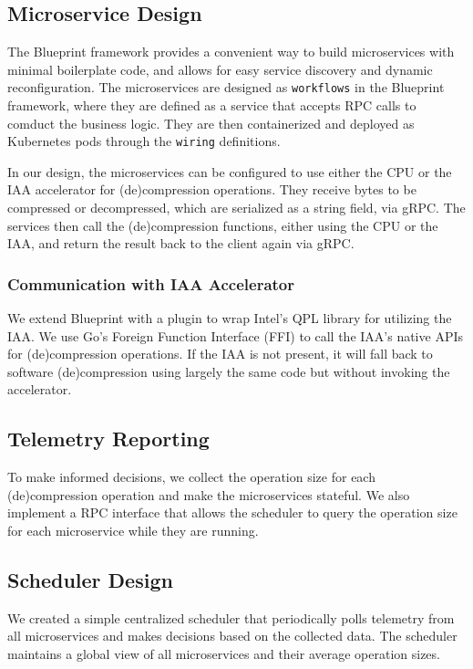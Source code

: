 \subsection{Microservice Design}

The Blueprint framework provides a convenient way to build microservices with minimal boilerplate code, and allows for easy service discovery and dynamic reconfiguration.
The microservices are designed as \texttt{workflows} in the Blueprint framework, where they are defined as a service that accepts RPC calls to comduct the business logic.
They are then containerized and deployed as Kubernetes pods through the \texttt{wiring} definitions.

In our design, the microservices can be configured to use either the CPU or the IAA accelerator for (de)compression operations.
They receive bytes to be compressed or decompressed, which are serialized as a string field, via gRPC.
The services then call the (de)compression functions, either using the CPU or the IAA, and return the result back to the client again via gRPC.

\subsubsection{Communication with IAA Accelerator}

We extend Blueprint with a plugin to wrap Intel's QPL library \cite{intelIntelQpl2025} for utilizing the IAA.
We use Go's Foreign Function Interface (FFI) to call the IAA's native APIs for (de)compression operations.
If the IAA is not present, it will fall back to software (de)compression using largely the same code but without invoking the accelerator.

\subsection{Telemetry Reporting}

To make informed decisions, we collect the operation size for each (de)compression operation and make the microservices stateful.
We also implement a RPC interface that allows the scheduler to query the operation size for each microservice while they are running.

\subsection{Scheduler Design}

We created a simple centralized scheduler that periodically polls telemetry from all microservices and makes decisions based on the collected data.
The scheduler maintains a global view of all microservices and their average operation sizes.

